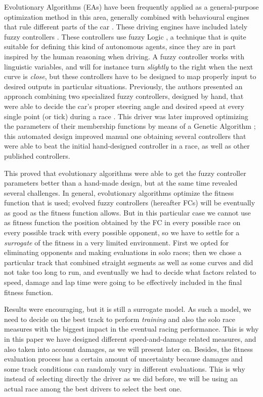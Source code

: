 \documentclass[conference]{IEEEtran}
\begin{document}
Evolutionary Algorithms (EAs) \cite{EAs_Back96} have been frequently
applied as a general-purpose optimization method in this area,
generally combined with behavioural engines that rule different parts
of the car
\cite{Floreano2004,CarRacing_Pelta09,SAES2012,QuadfliegMO,torcs2012}. These
driving engines have included lately fuzzy controllers
\cite{Guadarrama2008, LFAG, PerezEvolvingFuzzy09}. These controllers
use fuzzy Logic \cite{Fuzzy2011}, a  technique that is quite suitable
for defining this kind of autonomous agents, since they are in part
inspired by the human reasoning when driving. A fuzzy controller works
with linguistic variables, and will for instance turn {\em slightly}
to the right when the next curve is {\em close}, but these controllers
have to be designed to map properly input to desired outputs in
particular situations. Previously, the authors presented an approach
combining two specialized fuzzy controllers, designed by hand, that
were able to decide the car's proper steering angle and desired speed
at every single point (or tick) during a race \cite{evo17}. This
driver was later improved \cite{evo18} optimizing the parameters of
their membership functions by means of a Genetic Algorithm
\cite{GAs_Goldberg89}; this automated design improved manual one
obtaining several controllers that were able to beat the initial
hand-designed controller in a race, as well as other published
controllers. 

This proved that evolutionary algorithms were able to get the fuzzy
controller parameters better than a hand-made design, but at the same
time revealed several challenges. In general, evolutionary algorithms
optimize the fitness function that is used; evolved fuzzy controllers
(hereafter FCs)
will be eventually as good as the fitness function allows. But in this
particular case we cannot use as fitness function the position
obtained by the FC in every possible race on every possible track with
every possible opponent, so we have to settle for a {\em surrogate} of
the fitness in a very limited environment. First we opted for
eliminating opponents and making evaluations in solo races; then we
chose a particular track that combined straight segments as well as
some curves and did not take too long to run, and eventually we had to
decide what factors related to speed, damage and lap time were going
to be effectively included in the final fitness function. 

Results were encouraging, but it is still a surrogate model. As such a
model, we need to decide on the best track to perform {\em training}
and also the solo race measures with the biggest impact in the
eventual racing performance. This is why in this paper we have
designed different speed-and-damage related measures, and also taken
into account damages, as we will present later on. Besides, the
fitness evaluation process has a certain amount of uncertainty because
damages and some track conditions can randomly vary in different
evaluations. This is why instead of selecting directly the driver as
we did before, we will be using an actual race among the best drivers
to select the best one.
\end{document}

